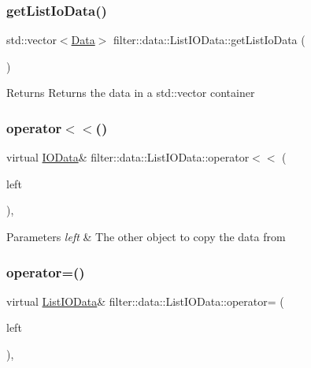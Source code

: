 \subsubsection{\texorpdfstring{get\+List\+Io\+Data()}{getListIoData()}}
{\footnotesize\ttfamily std\+::vector$<$\hyperlink{classfilter_1_1data_1_1_data}{Data}$>$ filter\+::data\+::\+List\+I\+O\+Data\+::get\+List\+Io\+Data (\begin{DoxyParamCaption}{ }\end{DoxyParamCaption})\hspace{0.3cm}{\ttfamily [inline]}}

\begin{DoxyReturn}{Returns}
Returns the data in a std\+::vector container 
\end{DoxyReturn}
\mbox{\label{classfilter_1_1data_1_1_list_i_o_data_a99b6bad4d2a1899c099e79ef6ec9bfbb}} 
\subsubsection{\texorpdfstring{operator$<$$<$()}{operator<<()}}
{\footnotesize\ttfamily virtual \hyperlink{classfilter_1_1data_1_1_i_o_data}{I\+O\+Data}\& filter\+::data\+::\+List\+I\+O\+Data\+::operator$<$$<$ (\begin{DoxyParamCaption}\item[{const \hyperlink{classfilter_1_1data_1_1_list_i_o_data}{List\+I\+O\+Data} \&}]{left }\end{DoxyParamCaption})\hspace{0.3cm}{\ttfamily [inline]}, {\ttfamily [virtual]}}


\begin{DoxyParams}{Parameters}
{\em left} & The other object to copy the data from \\
\hline
\end{DoxyParams}
\mbox{\label{classfilter_1_1data_1_1_list_i_o_data_a0c5040ca622f5eacc9bdc03bb609e5e9}} 
\subsubsection{\texorpdfstring{operator=()}{operator=()}}
{\footnotesize\ttfamily virtual \hyperlink{classfilter_1_1data_1_1_list_i_o_data}{List\+I\+O\+Data}\& filter\+::data\+::\+List\+I\+O\+Data\+::operator= (\begin{DoxyParamCaption}\item[{const \hyperlink{classfilter_1_1data_1_1_list_i_o_data}{List\+I\+O\+Data} \&}]{left }\end{DoxyParamCaption})\hspace{0.3cm}{\ttfamily [inline]}, {\ttfamily [virtual]}}


